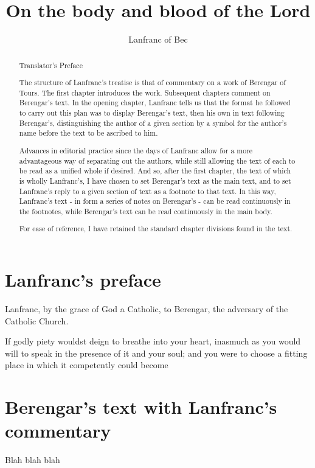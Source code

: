 \documentclass[]{article}
\title{On the body and blood of the Lord}
\author{Lanfranc of Bec}
\begin{document}
\maketitle

\begin{abstract}
Translator's Preface

The structure of Lanfranc's treatise is that of commentary on a work of Berengar of Tours. The first chapter introduces the work. Subsequent chapters comment on Berengar's text. In the opening chapter, Lanfranc tells us that the format he followed to carry out this plan was to display Berengar's text, then his own in text following Berengar's, distinguishing the author of a given section by a symbol for the author's name before the text to be ascribed to him.

Advances in editorial practice since the days of Lanfranc allow for a more advantageous way of separating out the authors, while still allowing the text of each to be read as a unified whole if desired. And so, after the first chapter, the text of which is wholly Lanfranc's, I have chosen to set Berengar's text as the main text, and to set Lanfranc's reply to a given section of text as a footnote to that text. In this way, Lanfranc's text - in form a series of notes on Berengar's - can be read continuously in the footnotes, while Berengar's text can be read continuously in the main body.

For ease of reference, I have retained the standard chapter divisions found in the text.
\end{abstract}

\section{Lanfranc's preface}
Lanfranc, by the grace of God a Catholic, to Berengar, the adversary of the Catholic Church.

If godly piety wouldst deign to breathe into your heart, inasmuch as you would will to speak in the presence of it and your soul; and you were to choose a fitting place in which it competently could become 
\section{Berengar's text with Lanfranc's commentary}

Blah blah blah
\end{document}
